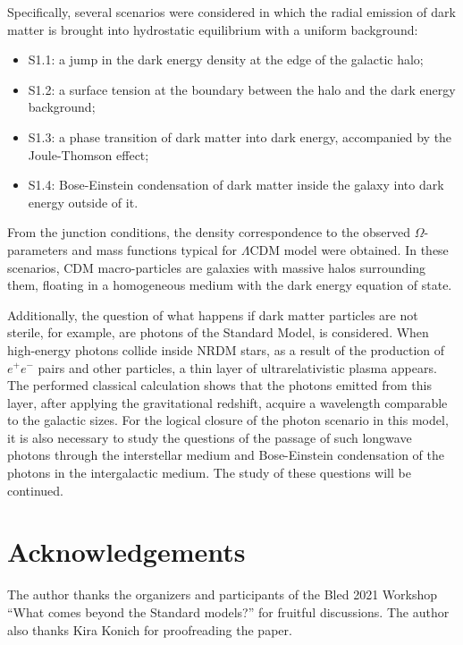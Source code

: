 \documentclass{article}
\begin{document}
Specifically, several scenarios were considered in which the radial emission of dark matter is brought into hydrostatic equilibrium with a uniform background:

\begin {itemize}
\item [S1.1:] a jump in the dark energy density at the edge of the galactic halo;
\item [S1.2:] a surface tension at the boundary between the halo and the dark energy background;
\item [S1.3:] a phase transition of dark matter into dark energy, accompanied by the Joule-Thomson effect;
\item [S1.4:] Bose-Einstein condensation of dark matter inside the galaxy into dark energy outside of it.
\end {itemize}

From the junction conditions, the density correspondence to the observed $ \Omega $-parameters and mass functions typical for $ \Lambda $CDM model were obtained. In these scenarios, CDM macro-particles are galaxies with massive halos surrounding them, floating in a homogeneous medium with the dark energy equation of state.

Additionally, the question of what happens if dark matter particles are not sterile, for example, are photons of the Standard Model, is considered. When high-energy photons collide inside NRDM stars, as a result of the production of $ e ^ + e ^ - $ pairs and other particles, a thin layer of ultrarelativistic plasma appears. The performed classical calculation shows that the photons emitted from this layer, after applying the gravitational redshift, acquire a wavelength comparable to the galactic sizes. For the logical closure of the photon scenario in this model, it is also necessary to study the questions of the passage of such longwave photons through the interstellar medium and Bose-Einstein condensation of the photons in the intergalactic medium. The study of these questions will be continued. 

\section*{Acknowledgements}
The author thanks the organizers and participants of the Bled 2021 Workshop ``What comes beyond the Standard models?'' for fruitful discussions. The author also thanks Kira Konich for proofreading the paper.

\footnotesize
\end{document}

